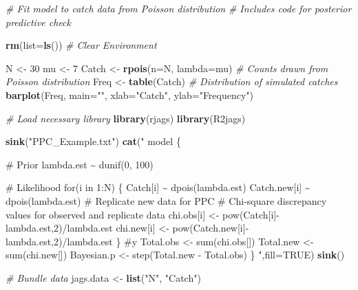 \documentclass[
]{krantz}
\makeatletter
\newenvironment{Shaded}{\begin{snugshade}}{\end{snugshade}}
\newcommand{\AttributeTok}[1]{\textcolor[rgb]{0.27,0.27,0.27}{#1}}
\newcommand{\CommentTok}[1]{\textcolor[rgb]{0.37,0.37,0.37}{\textit{#1}}}
\newcommand{\ConstantTok}[1]{\textcolor[rgb]{0.37,0.37,0.37}{#1}}
\newcommand{\DecValTok}[1]{\textcolor[rgb]{0.06,0.06,0.06}{#1}}
\newcommand{\FunctionTok}[1]{\textcolor[rgb]{0.27,0.27,0.27}{\textbf{#1}}}
\newcommand{\NormalTok}[1]{#1}
\newcommand{\OtherTok}[1]{\textcolor[rgb]{0.37,0.37,0.37}{#1}}
\newcommand{\StringTok}[1]{\textcolor[rgb]{0.5,0.5,0.5}{#1}}
\newenvironment{kframe}{%
\medskip{}
\setlength{\fboxsep}{.8em}
 \def\at@end@of@kframe{}%
 \ifinner\ifhmode%
  \def\at@end@of@kframe{\end{minipage}}%
  \begin{minipage}{\columnwidth}%
 \fi\fi%
 \def\FrameCommand##1{\hskip\@totalleftmargin \hskip-\fboxsep
 \colorbox{shadecolor}{##1}\hskip-\fboxsep
     \hskip-\linewidth \hskip-\@totalleftmargin \hskip\columnwidth}%
 \MakeFramed {\advance\hsize-\width
   \@totalleftmargin\z@ \linewidth\hsize
   \@setminipage}}%
 {\par\unskip\endMakeFramed%
 \at@end@of@kframe}
\renewenvironment{Shaded}{\begin{kframe}}{\end{kframe}}
\makeatother
\begin{document}
\begin{Shaded}
\begin{Highlighting}[]
\CommentTok{\# Fit model to catch data from Poisson distribution}
\CommentTok{\# Includes code for posterior predictive check}

\FunctionTok{rm}\NormalTok{(}\AttributeTok{list=}\FunctionTok{ls}\NormalTok{()) }\CommentTok{\# Clear Environment}

\NormalTok{N }\OtherTok{\textless{}{-}} \DecValTok{30}
\NormalTok{mu }\OtherTok{\textless{}{-}} \DecValTok{7}
\NormalTok{Catch }\OtherTok{\textless{}{-}} \FunctionTok{rpois}\NormalTok{(}\AttributeTok{n=}\NormalTok{N, }\AttributeTok{lambda=}\NormalTok{mu) }\CommentTok{\# Counts drawn from Poisson distribution}
\NormalTok{Freq }\OtherTok{\textless{}{-}} \FunctionTok{table}\NormalTok{(Catch)  }\CommentTok{\# Distribution of simulated catches}
\FunctionTok{barplot}\NormalTok{(Freq, }\AttributeTok{main=}\StringTok{""}\NormalTok{, }\AttributeTok{xlab=}\StringTok{"Catch"}\NormalTok{, }\AttributeTok{ylab=}\StringTok{"Frequency"}\NormalTok{)}

\CommentTok{\# Load necessary library}
\FunctionTok{library}\NormalTok{(rjags)}
\FunctionTok{library}\NormalTok{(R2jags)}

\FunctionTok{sink}\NormalTok{(}\StringTok{"PPC\_Example.txt"}\NormalTok{)}
\FunctionTok{cat}\NormalTok{(}\StringTok{"}
\StringTok{model \{}

\StringTok{\# Prior}
\StringTok{ lambda.est \textasciitilde{} dunif(0, 100)}

\StringTok{\# Likelihood}
\StringTok{    for(i in 1:N) \{}
\StringTok{      Catch[i] \textasciitilde{} dpois(lambda.est)}
\StringTok{      Catch.new[i] \textasciitilde{} dpois(lambda.est) \# Replicate new data for PPC}
\StringTok{      \# Chi{-}square discrepancy values for observed and replicate data}
\StringTok{      chi.obs[i] \textless{}{-} pow(Catch[i]{-}lambda.est,2)/lambda.est}
\StringTok{      chi.new[i] \textless{}{-} pow(Catch.new[i]{-}lambda.est,2)/lambda.est}
\StringTok{      \} \#y}
\StringTok{  Total.obs \textless{}{-} sum(chi.obs[])}
\StringTok{  Total.new \textless{}{-} sum(chi.new[])}
\StringTok{  Bayesian.p \textless{}{-} step(Total.new {-} Total.obs)}
\StringTok{\}}
\StringTok{    "}\NormalTok{,}\AttributeTok{fill=}\ConstantTok{TRUE}\NormalTok{)}
\FunctionTok{sink}\NormalTok{()}

\CommentTok{\# Bundle data}
\NormalTok{jags.data }\OtherTok{\textless{}{-}} \FunctionTok{list}\NormalTok{(}\StringTok{"N"}\NormalTok{, }\StringTok{"Catch"}\NormalTok{)}


\end{Highlighting}
\end{Shaded}
\end{document}
